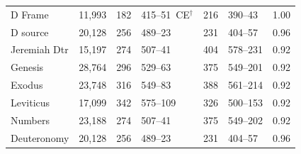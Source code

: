 \begin{table}[!ht]
\begin{tabular}{lrrlrlr}
D Frame             & 11{,}993 & 182 & 415--51~CE$^\dagger$ & 216 & 390--43 & 1.00 \\
D source            & 20{,}128 & 256 & 489--23 & 231 & 404--57 & 0.96 \\
Jeremiah Dtr        & 15{,}197 & 274 & 507--41 & 404 & 578--231 & 0.92 \\
Genesis             & 28{,}764 & 296 & 529--63 & 375 & 549--201 & 0.92 \\
Exodus              & 23{,}748 & 316 & 549--83 & 388 & 561--214 & 0.92 \\
Leviticus           & 17{,}099 & 342 & 575--109 & 326 & 500--153 & 0.92 \\
Numbers             & 23{,}188 & 274 & 507--41 & 375 & 549--202 & 0.92 \\
Deuteronomy         & 20{,}128 & 256 & 489--23 & 231 & 404--57 & 0.96 \\
\hline
\end{tabular}
\label{tab:targets}
\end{table}

